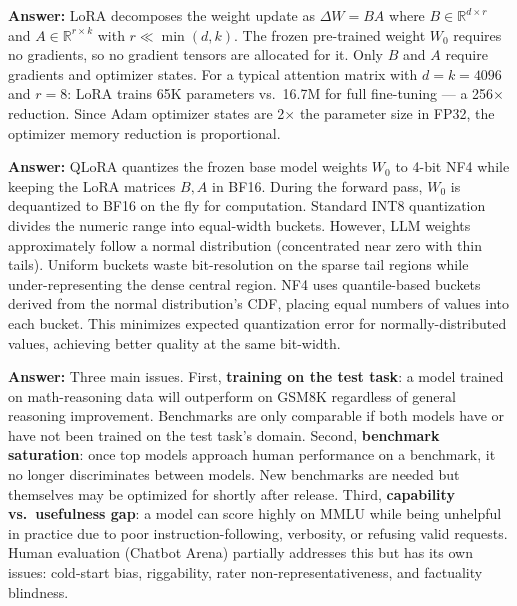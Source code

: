 \documentclass[11pt, a4paper]{article}
\begin{document}
\begin{notebox}
\textbf{Answer:} LoRA decomposes the weight update as $\Delta W = BA$ where $B \in \mathbb{R}^{d \times r}$ and $A \in \mathbb{R}^{r \times k}$ with $r \ll \min(d,k)$. The frozen pre-trained weight $W_0$ requires no gradients, so no gradient tensors are allocated for it. Only $B$ and $A$ require gradients and optimizer states. For a typical attention matrix with $d=k=4096$ and $r=8$: LoRA trains 65K parameters vs.\ 16.7M for full fine-tuning --- a 256$\times$ reduction. Since Adam optimizer states are 2$\times$ the parameter size in FP32, the optimizer memory reduction is proportional.
\end{notebox}

\begin{notebox}
\textbf{Answer:} QLoRA quantizes the frozen base model weights $W_0$ to 4-bit NF4 while keeping the LoRA matrices $B, A$ in BF16. During the forward pass, $W_0$ is dequantized to BF16 on the fly for computation. Standard INT8 quantization divides the numeric range into equal-width buckets. However, LLM weights approximately follow a normal distribution (concentrated near zero with thin tails). Uniform buckets waste bit-resolution on the sparse tail regions while under-representing the dense central region. NF4 uses quantile-based buckets derived from the normal distribution's CDF, placing equal numbers of values into each bucket. This minimizes expected quantization error for normally-distributed values, achieving better quality at the same bit-width.
\end{notebox}

\begin{notebox}
\textbf{Answer:} Three main issues. First, \textbf{training on the test task}: a model trained on math-reasoning data will outperform on GSM8K regardless of general reasoning improvement. Benchmarks are only comparable if both models have or have not been trained on the test task's domain. Second, \textbf{benchmark saturation}: once top models approach human performance on a benchmark, it no longer discriminates between models. New benchmarks are needed but themselves may be optimized for shortly after release. Third, \textbf{capability vs.\ usefulness gap}: a model can score highly on MMLU while being unhelpful in practice due to poor instruction-following, verbosity, or refusing valid requests. Human evaluation (Chatbot Arena) partially addresses this but has its own issues: cold-start bias, riggability, rater non-representativeness, and factuality blindness.
\end{notebox}
\end{document}
